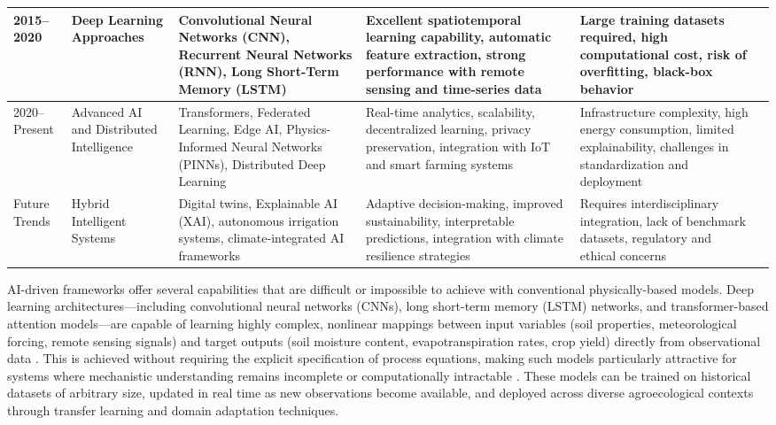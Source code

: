 \documentclass[land,article,submit,pdftex,moreauthors]{Definitions/mdpi}
\numberwithin{equation}{section}
\begin{document}
\begin{longtable}{p{1.4cm} p{1.6cm} p{2.2cm} p{2.9cm} p{2.9cm} p{1.5cm}}
2015--2020 &
Deep Learning Approaches &
Convolutional Neural Networks (CNN), Recurrent Neural Networks (RNN), Long Short-Term Memory (LSTM) &
Excellent spatiotemporal learning capability, automatic feature extraction, strong performance with remote sensing and time-series data &
Large training datasets required, high computational cost, risk of overfitting, black-box behavior &
\citep{Kratzert2018, Reichstein2019, Shen2018} \\ \hline

2020--Present &
Advanced AI and Distributed Intelligence &
Transformers, Federated Learning, Edge AI, Physics-Informed Neural Networks (PINNs), Distributed Deep Learning &
Real-time analytics, scalability, decentralized learning, privacy preservation, integration with IoT and smart farming systems &
Infrastructure complexity, high energy consumption, limited explainability, challenges in standardization and deployment &
\citep{Karniadakis2021, Lai} \\ \hline

Future Trends &
Hybrid Intelligent Systems &
Digital twins, Explainable AI (XAI), autonomous irrigation systems, climate-integrated AI frameworks &
Adaptive decision-making, improved sustainability, interpretable predictions, integration with climate resilience strategies &
Requires interdisciplinary integration, lack of benchmark datasets, regulatory and ethical concerns &
\citep{Pylianidis2021, Verdouw2021, arrieta2020explainable, Sit2020} \\

\end{longtable}
\normalsize

AI-driven frameworks offer several capabilities that are difficult or impossible to achieve with conventional physically-based models. Deep learning architectures---including convolutional neural networks (CNNs), long short-term memory (LSTM) networks, and transformer-based attention models---are capable of learning highly complex, nonlinear mappings between input variables (soil properties, meteorological forcing, remote sensing signals) and target outputs (soil moisture content, evapotranspiration rates, crop yield) directly from observational data \citep{Tripathy}. This is achieved without requiring the explicit specification of process equations, making such models particularly attractive for systems where mechanistic understanding remains incomplete or computationally intractable \citep{lecun2015deep}. These models can be trained on historical datasets of arbitrary size, updated in real time as new observations become available, and deployed across diverse agroecological contexts through transfer learning and domain adaptation techniques.
\end{document}
